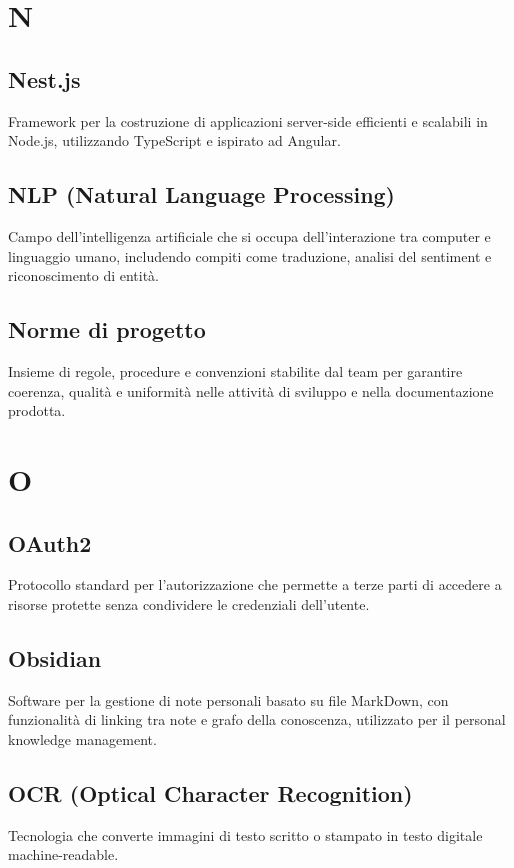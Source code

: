\documentclass[a4paper,11pt]{article}
\begin{document}
\newpage
\section{N}

\subsection{Nest.js}
Framework per la costruzione di applicazioni server-side efficienti e scalabili in Node.js, utilizzando TypeScript e ispirato ad Angular.

\subsection{NLP (Natural Language Processing)}
Campo dell'intelligenza artificiale che si occupa dell'interazione tra computer e linguaggio umano, includendo compiti come traduzione, analisi del sentiment e riconoscimento di entità.

\subsection{Norme di progetto}
Insieme di regole, procedure e convenzioni stabilite dal team per garantire coerenza, qualità e uniformità nelle attività di sviluppo e nella documentazione prodotta.

\newpage
\section{O}

\subsection{OAuth2}
Protocollo standard per l'autorizzazione che permette a terze parti di accedere a risorse protette senza condividere le credenziali dell'utente.

\subsection{Obsidian}
Software per la gestione di note personali basato su file MarkDown, con funzionalità di linking tra note e grafo della conoscenza, utilizzato per il personal knowledge management.

\subsection{OCR (Optical Character Recognition)}
Tecnologia che converte immagini di testo scritto o stampato in testo digitale machine-readable.
\end{document}

